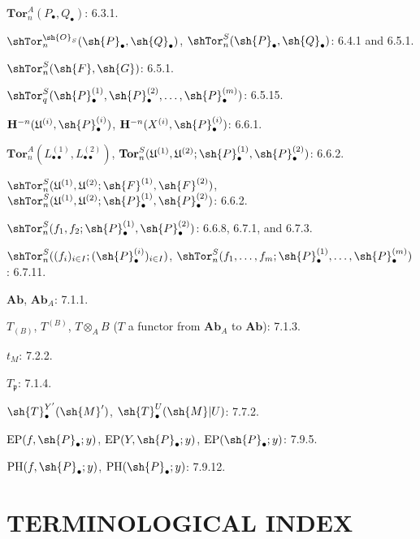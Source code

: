 \begin{flushleft}
$\mathbf{Tor}_n^A(P_\bullet,Q_\bullet)$: 6.3.1.

\medskip
$\shTor_n^{\sh{O}_S}(\sh{P}_\bullet,\sh{Q}_\bullet)$,
$\shTor_n^S(\sh{P}_\bullet,\sh{Q}_\bullet)$: 6.4.1 and 6.5.1.

\medskip
$\shTor_n^S(\sh{F},\sh{G})$: 6.5.1.

\medskip
$\shTor_q^S(\sh{P}_\bullet^{(1)},\sh{P}_\bullet^{(2)},\ldots,
\sh{P}_\bullet^{(m)})$: 6.5.15.

\medskip
$\mathbf H^{-n}(\mathfrak U^{(i)},\sh{P}_\bullet^{(i)})$,
$\mathbf H^{-n}(X^{(i)},\sh{P}_\bullet^{(i)})$: 6.6.1.

\medskip
$\mathbf{Tor}_n^A(L_{\bullet\bullet}^{(1)},L_{\bullet\bullet}^{(2)})$,
$\mathbf{Tor}_n^S(\mathfrak U^{(1)},\mathfrak U^{(2)};
\sh{P}_\bullet^{(1)},\sh{P}_\bullet^{(2)})$: 6.6.2.

\medskip
$\shTor_n^S(\mathfrak U^{(1)},\mathfrak U^{(2)};
\sh{F}^{(1)},\sh{F}^{(2)})$,
$\shTor_n^S(\mathfrak U^{(1)},\mathfrak U^{(2)};
\sh{P}_\bullet^{(1)},\sh{P}_\bullet^{(2)})$: 6.6.2.

\medskip
$\shTor_n^S(f_1,f_2;\sh{P}_\bullet^{(1)},
\sh{P}_\bullet^{(2)})$: 6.6.8, 6.7.1, and 6.7.3.

\medskip
$\shTor_n^S((f_i)_{i\in I};(\sh{P}_\bullet^{(i)})_{i\in I})$,
$\shTor_n^S(f_1,\ldots,f_m;\sh{P}_\bullet^{(1)},\ldots,
\sh{P}_\bullet^{(m)})$: 6.7.11.

\medskip
$\mathbf{Ab}$, $\mathbf{Ab}_A$: 7.1.1.

\medskip
$T_{(B)}$, $T^{(B)}$, $T\otimes_A B$
($T$ a functor from $\mathbf{Ab}_A$ to $\mathbf{Ab}$): 7.1.3.

\medskip
$t_M$: 7.2.2.

\medskip
$T_{\mathfrak p}$: 7.1.4.

\medskip
$\sh{T}_\bullet^{Y'}(\sh{M}')$,
$\sh{T}_\bullet^U(\sh{M}|U)$: 7.7.2.

\medskip
$\operatorname{EP}(f,\sh{P}_\bullet;y)$,
$\operatorname{EP}(Y,\sh{P}_\bullet;y)$,
$\operatorname{EP}(\sh{P}_\bullet;y)$: 7.9.5.

\medskip
$\operatorname{PH}(f,\sh{P}_\bullet;y)$,
$\operatorname{PH}(\sh{P}_\bullet;y)$: 7.9.12.
\end{flushleft}

\clearpage
{}
\section*{TERMINOLOGICAL INDEX}

